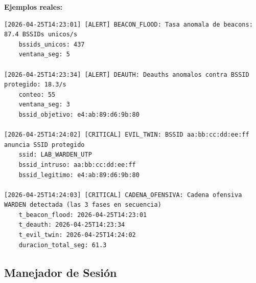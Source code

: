 \documentclass[11pt,a4paper]{article}
\begin{document}
\textbf{Ejemplos reales:}

\begin{lstlisting}
[2026-04-25T14:23:01] [ALERT] BEACON_FLOOD: Tasa anomala de beacons: 87.4 BSSIDs unicos/s
    bssids_unicos: 437
    ventana_seg: 5

[2026-04-25T14:23:34] [ALERT] DEAUTH: Deauths anomalos contra BSSID protegido: 18.3/s
    conteo: 55
    ventana_seg: 3
    bssid_objetivo: e4:ab:89:d6:9b:80

[2026-04-25T14:24:02] [CRITICAL] EVIL_TWIN: BSSID aa:bb:cc:dd:ee:ff anuncia SSID protegido
    ssid: LAB_WARDEN_UTP
    bssid_intruso: aa:bb:cc:dd:ee:ff
    bssid_legitimo: e4:ab:89:d6:9b:80

[2026-04-25T14:24:03] [CRITICAL] CADENA_OFENSIVA: Cadena ofensiva WARDEN detectada (las 3 fases en secuencia)
    t_beacon_flood: 2026-04-25T14:23:01
    t_deauth: 2026-04-25T14:23:34
    t_evil_twin: 2026-04-25T14:24:02
    duracion_total_seg: 61.3
\end{lstlisting}

\subsection{Manejador de Sesión}
\end{document}
